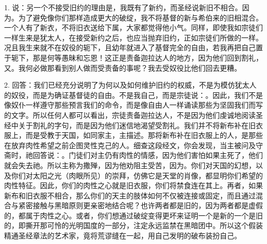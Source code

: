 \par

1. 说：另一个不接受旧约的理由是，我既有了新约，而圣经说新旧不相合。因为。为了避免像你们那样造成更大的破绽，我不将基督的新与希伯来的旧相混合。一个人有了新衣，不将旧衣送给下属，大家都觉得他小气。同样，即使我如宗徒们一样生来是犹太人，在接受新约之后，也应当抛弃旧约，正如宗徒们所做的一样。况且我生来就不在奴役的轭下，且幼年就进入了基督完全的自由，若我再把自己置于轭下，那是何等愚昧和忘恩！这正是责备迦拉达人的地方，因为他们回到割礼，又。我何必做那看到别人做而受责备的事呢？我去受奴役比他们回去更糟。\par

2. 回答：我们已经充分说明了为何以及如何维护旧约的权威，不是为模仿犹太人的奴役，而是为确证基督徒的自由。不是我自己，而是宗徒说：。因此，我们不是像奴仆一样遵守那些预言我们的命令，而是像自由人一样诵读那些为坚固我们而写的文字。所以任何人都可以看出，宗徒责备迦拉达人，不是因为他们虔诚地阅读圣经中关于割礼的字句，而是因为他们迷信地渴望受割礼。我们并不将新布补在旧衣服上，而是受教于天国，如同家主，主描述。那将新布补在旧衣服上的人，是那些在放弃肉性希望之前企图灵性克己的人。细查这段经文，你会发现，当主被问及守斋时，祂回答说：。门徒们对主仍有肉性的情感，因为他们害怕如果主死了，他们就会失去祂。所以主称为撒殚，因为他劝阻主受苦，因为。你们对天国的幻想，以及你们对太阳之光（肉眼所见）的崇拜，仿佛它是天堂的肖像，都显明你们希望的肉性特征。因此，你们的肉性之心就是旧衣服，你们将禁食连在其上。再者，如果新布和旧衣服不相合，那么你们的天主的肢体如何不仅被连接或固定，而且通过混合与紧密接触与黑暗原则更亲密地结合呢？也许两者都是旧的，因为两者都是虚假的，都属于肉性之心。或者，你们想通过破绽变得更坏来证明一个是新的一个是旧的，即撕开那可怜的光明国度的一部分，注定永远监禁在黑暗团中。所以这个假装精通圣经章法的艺术家，竟将荒谬缝在一起，用自己发明的破布装扮自己。\par


